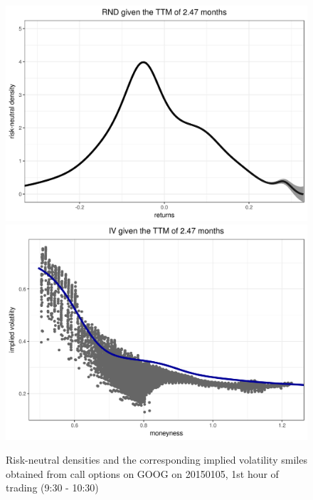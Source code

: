 \documentclass[a4paper,12pt]{article}
\theoremstyle{plain}
\theoremstyle{definition}
\begin{document}
\begin{figure}[H]
\begin{center}
 \endminipage\\
 \includegraphics[width=\linewidth]{figures/hour_1th/GOOG_20150105_rnd_ci_1th_hour_ttm_2_47.png}
 \endminipage
 \hspace{3mm}
 \includegraphics[width=\linewidth]{figures/hour_1th/GOOG_20150105_iv_smile_1th_hour_ttm_2_47.png}
 \endminipage
\end{center}
\vspace{-3mm}
\caption{\footnotesize Risk-neutral densities and the corresponding implied volatility smiles obtained from call options on GOOG on 20150105, 1st hour of trading (9:30 - 10:30)} 
\label{rnd1}
\end{figure}

\newpage
\end{document}

